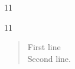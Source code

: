 \documentclass[paper=A4]{ropas-poster}
\begin{document}
\begin{postergrid}{1}{1}
\begin{posterblock}{1}{1}
\begin{verse}First line\\
Second line.\end{verse}
\end{posterblock}
\end{postergrid}
\end{document}
